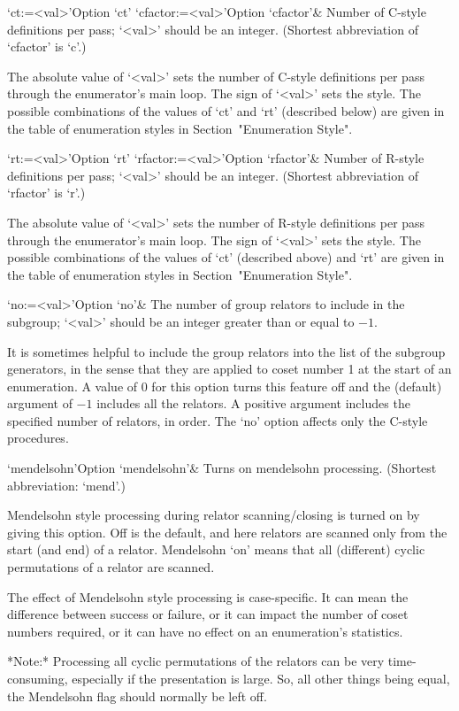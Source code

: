 \>`ct:=<val>'{Option `ct'}
\>`cfactor:=<val>'{Option `cfactor'}&
Number of C-style definitions per pass; `<val>' should be an  integer. 
(Shortest abbreviation of `cfactor' is `c'.)

The absolute value of `<val>' sets the
number of C-style definitions per  pass through  the enumerator's main
loop. The sign of `<val>'  sets the  style. The possible  combinations
of the values of `ct' and  `rt'  (described below)  are  given in  the
table of  enumeration styles in Section~"Enumeration Style".

\>`rt:=<val>'{Option `rt'}
\>`rfactor:=<val>'{Option `rfactor'}&
Number of R-style definitions per pass; `<val>' should be an  integer. 
(Shortest abbreviation of `rfactor' is `r'.)

The absolute value of `<val>' sets the
number of R-style definitions per  pass through  the enumerator's main
loop. The sign of `<val>'  sets the  style. The possible  combinations
of the values of `ct' (described above)  and  `rt'  are  given in  the
table of  enumeration styles in Section~"Enumeration Style".

\>`no:=<val>'{Option `no'}&
The number of group relators to include in the subgroup;  
`<val>' should be an integer greater than or equal to $-1$.

It is sometimes helpful to include the group relators into the list of
the subgroup generators, in the sense that they are applied  to  coset
number 1 at the start of an enumeration. A value of 0 for this  option
turns this feature off and the (default) argument of $-1$ includes all
the relators. A positive argument includes  the  specified  number  of
relators,  in  order.  The  `no'  option  affects  only  the   C-style
procedures.

\>`mendelsohn'{Option `mendelsohn'}&
Turns on mendelsohn processing. (Shortest abbreviation: `mend'.)

Mendelsohn style processing during relator scanning/closing is  turned
on by giving this option. Off is the default, and  here  relators  are
scanned only from  the  start  (and  end)  of  a  relator.  Mendelsohn
\lq{}on' means that all (different) cyclic permutations of  a  relator
are scanned.

The effect of Mendelsohn style processing  is  case-specific.  It  can
mean the difference between success or failure, or it can  impact  the
number of coset numbers required, or it  can  have  no  effect  on  an
enumeration's statistics.

*Note:* Processing all cyclic permutations of the relators can be very
time-consuming,  especially if  the  presentation is  large.  So,  all
other things being equal, the  Mendelsohn flag should normally be left
off.

